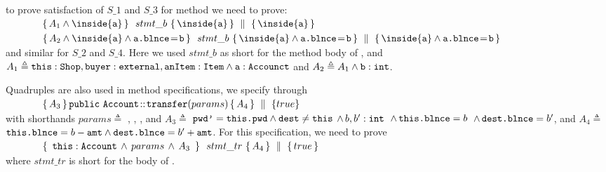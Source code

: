 \Eg to prove satisfaction of $S\_1$ and $S\_3$ for method  we  need to prove:
\\
$\strut \ \ \ \ \ \ \ \ \ \ \ \quadruple {A_1  \wedge \inside{\prg{a}} } {\ stmt\_b  \ } {\inside{\prg{a}}} { \inside{\prg{a}}} $
\\
$\strut \ \ \ \ \ \  \ \  \ \ \   \quadruple {A_2  \wedge  \inside{\prg{a}} \wedge  \prg{a.\balance}\!=\!{\prg{b}} } {\   stmt\_b  \  } {\inside{\prg{a}} \wedge  \prg{a.\balance}\!=\!\prg{b}}   
                         {  \inside{\prg{a}} \wedge  \prg{a.\balance}\!=\!\prg{b} }$
\\
and similar for $S\_2$ and $S\_4$. Here we used   $stmt\_b$  as short for the method body of , and $A_1 \triangleq \mbox{\normalfont{\texttt{this}}}:\mbox{\normalfont{\texttt{Shop}}}, \mbox{\normalfont{\texttt{buyer}}}:\mbox{\normalfont{\texttt{external}}}, \mbox{\normalfont{\texttt{anItem}}}:\mbox{\normalfont{\texttt{Item}}} \wedge \mbox{\normalfont{\texttt{a}}}:\mbox{\normalfont{\texttt{Accounct}}}$
and $A_2 \triangleq A_1 \wedge \mbox{\normalfont{\texttt{b}}}:\mbox{\normalfont{\texttt{int}}}$.
 
Quadruples are also used in method specifications, \eg we specify  through
\\
$\strut \ \ \ \ \ \  \ \  \ \ \  { \mprepostLongN {A_3}{\prg{public}\ \prg{Account}}{\prg{transfer}}{params}{A_4} {true} }$
\\
with shorthands 
$params \triangleq$ , , , and 
$A_3  \triangleq$  $\mbox{\normalfont{\texttt{pwd'}}}=\mbox{\normalfont{\texttt{this.\mbox{\normalfont{\texttt{pwd}}}}}} \wedge \mbox{\normalfont{\texttt{dest}}}\neq \mbox{\normalfont{\texttt{this}}}$
$\wedge\, b, b':\mbox{\normalfont{\texttt{int}}}$
$\, \wedge\, \mbox{\normalfont{\texttt{this.\mbox{\normalfont{\texttt{blnce}}}}}}=b$ 
$\, \wedge\,  \mbox{\normalfont{\texttt{dest.\mbox{\normalfont{\texttt{blnce}}}}}}=b'$, 
 and $A_4 \triangleq$  
 $\mbox{\normalfont{\texttt{this.\mbox{\normalfont{\texttt{blnce}}}}}}=b-\mbox{\normalfont{\texttt{amt}}} \wedge \mbox{\normalfont{\texttt{dest.\mbox{\normalfont{\texttt{blnce}}}}}}=b'+\mbox{\normalfont{\texttt{amt}}}$.
For this specification, we need to prove\\
$\strut \ \ \ \ \ \ \ \ \ \ \ \quadruple {\ \prg{this}:\prg{Account}\, \wedge\, params\, \wedge\, A_3  \  } {\ stmt\_{tr}  \ } {A_4} { true} $
\\
where $stmt\_{tr}$ is short for the body of  .



